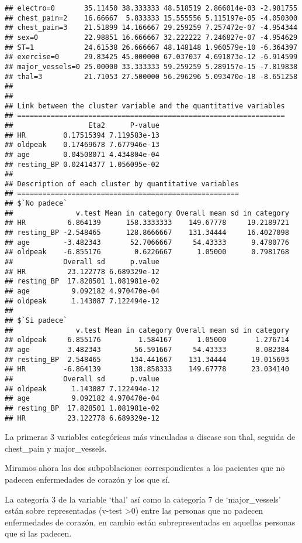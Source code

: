 \documentclass[]{article}
\begin{document}
\begin{verbatim}
## electro=0       35.11450 38.333333 48.518519 2.866014e-03 -2.981755
## chest_pain=2    16.66667  5.833333 15.555556 5.115197e-05 -4.050300
## chest_pain=3    21.51899 14.166667 29.259259 7.257472e-07 -4.954344
## sex=0           22.98851 16.666667 32.222222 7.246827e-07 -4.954629
## ST=1            24.61538 26.666667 48.148148 1.960579e-10 -6.364397
## exercise=0      29.83425 45.000000 67.037037 4.691873e-12 -6.914599
## major_vessels=0 25.00000 33.333333 59.259259 5.289157e-15 -7.819838
## thal=3          21.71053 27.500000 56.296296 5.093470e-18 -8.651258
## 
## 
## Link between the cluster variable and the quantitative variables
## ================================================================
##                  Eta2      P-value
## HR         0.17515394 7.119583e-13
## oldpeak    0.17469678 7.677946e-13
## age        0.04508071 4.434804e-04
## resting_BP 0.02414377 1.056095e-02
## 
## Description of each cluster by quantitative variables
## =====================================================
## $`No padece`
##               v.test Mean in category Overall mean sd in category
## HR          6.864139      158.3333333    149.67778     19.2189721
## resting_BP -2.548465      128.8666667    131.34444     16.4027098
## age        -3.482343       52.7066667     54.43333      9.4780776
## oldpeak    -6.855176        0.6226667      1.05000      0.7981768
##            Overall sd      p.value
## HR          23.122778 6.689329e-12
## resting_BP  17.828501 1.081981e-02
## age          9.092182 4.970470e-04
## oldpeak      1.143087 7.122494e-12
## 
## $`Si padece`
##               v.test Mean in category Overall mean sd in category
## oldpeak     6.855176         1.584167      1.05000       1.276714
## age         3.482343        56.591667     54.43333       8.082384
## resting_BP  2.548465       134.441667    131.34444      19.015693
## HR         -6.864139       138.858333    149.67778      23.034140
##            Overall sd      p.value
## oldpeak      1.143087 7.122494e-12
## age          9.092182 4.970470e-04
## resting_BP  17.828501 1.081981e-02
## HR          23.122778 6.689329e-12
\end{verbatim}

La primeras 3 variables categóricas más vinculadas a disease son thal,
seguida de chest\_pain y major\_vessels.

Miramos ahora las dos subpoblaciones correspondientes a los pacientes
que no padecen enfermedades de corazón y los que sí.

La categoría 3 de la variable `thal' así como la categoría 7 de
`major\_vessels' están sobre representadas (v-test \textgreater{}0)
entre las personas que no padecen enfermedades de corazón, en cambio
están subrepresentadas en aquellas personas que sí las padecen.
\end{document}
